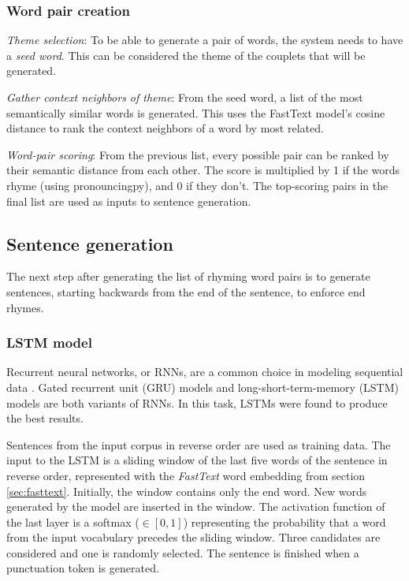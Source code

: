 \documentclass[11pt,a4paper]{article}
\newenvironment{tight_enumerate}{
\begin{enumerate}
\setlength{\itemsep}{0pt}
\setlength{\parskip}{0pt}
}{\end{enumerate}}
\begin{document}
\subsubsection{Word pair creation}
\begin{tight_enumerate}
	\item \textit{Theme selection}: To be able to generate a pair of words, the system needs to have a \textit{seed word}. This can be considered the theme of the couplets that will be generated.
	\item \textit{Gather context neighbors of theme}: From the seed word, a list of the most semantically similar words is generated. This uses the FastText model's cosine distance to rank the context neighbors of a word by most related.
	\item \textit{Word-pair scoring}: From the previous list, every possible pair can be ranked by their semantic distance from each other. The score is multiplied by 1 if the words rhyme (using pronouncingpy), and 0 if they don't. The top-scoring pairs in the final list are used as inputs to sentence generation.
\end{tight_enumerate}

\subsection{Sentence generation}
\label{sec:languagegen}

The next step after generating the list of rhyming word pairs is to generate sentences, starting backwards from the end of the sentence, to enforce end rhymes.

\subsubsection{LSTM model}
\label{sec:lstm}
Recurrent neural networks, or RNNs, are a common choice in modeling sequential data \cite{rnn}. Gated recurrent unit (GRU) models \cite{gru} and long-short-term-memory (LSTM) models \cite{lstm} are both variants of RNNs. In this task, LSTMs were found to produce the best results.

Sentences from the input corpus in reverse order are used as training data. The input to the LSTM is a sliding window of the last five words of the sentence in reverse order, represented with the \textit{FastText} word embedding from section \ref{sec:fasttext}. Initially, the window contains only the end word. New words generated by the model are inserted in the window. The activation function of the last layer is a softmax ($\in [0, 1]$) representing the probability that a word from the input vocabulary precedes the sliding window. Three candidates are considered and one is randomly selected. The sentence is finished when a punctuation token is generated.
\end{document}
